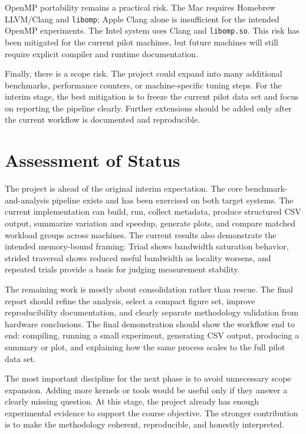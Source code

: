 \documentclass[11pt]{article}
\begin{document}
OpenMP portability remains a practical risk. The Mac requires Homebrew LLVM/Clang and \texttt{libomp}; Apple Clang alone is insufficient for the intended OpenMP experiments. The Intel system uses Clang and \texttt{libomp.so}. This risk has been mitigated for the current pilot machines, but future machines will still require explicit compiler and runtime documentation.

Finally, there is a scope risk. The project could expand into many additional benchmarks, performance counters, or machine-specific tuning steps. For the interim stage, the best mitigation is to freeze the current pilot data set and focus on reporting the pipeline clearly. Further extensions should be added only after the current workflow is documented and reproducible.

\section{Assessment of Status}

The project is ahead of the original interim expectation. The core benchmark-and-analysis pipeline exists and has been exercised on both target systems. The current implementation can build, run, collect metadata, produce structured CSV output, summarize variation and speedup, generate plots, and compare matched workload groups across machines. The current results also demonstrate the intended memory-bound framing: Triad shows bandwidth saturation behavior, strided traversal shows reduced useful bandwidth as locality worsens, and repeated trials provide a basis for judging measurement stability.

The remaining work is mostly about consolidation rather than rescue. The final report should refine the analysis, select a compact figure set, improve reproducibility documentation, and clearly separate methodology validation from hardware conclusions. The final demonstration should show the workflow end to end: compiling, running a small experiment, generating CSV output, producing a summary or plot, and explaining how the same process scales to the full pilot data set.

The most important discipline for the next phase is to avoid unnecessary scope expansion. Adding more kernels or tools would be useful only if they answer a clearly missing question. At this stage, the project already has enough experimental evidence to support the course objective. The stronger contribution is to make the methodology coherent, reproducible, and honestly interpreted.
\end{document}
